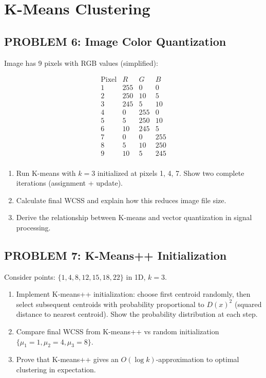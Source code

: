 \documentclass[12pt]{article}
\begin{document}
\newpage
\section*{K-Means Clustering}

\subsection*{PROBLEM 6: Image Color Quantization}

Image has 9 pixels with RGB values (simplified):

\[\begin{array}{c|ccc}
\text{Pixel} & R & G & B \\
\hline
1 & 255 & 0 & 0 \\
2 & 250 & 10 & 5 \\
3 & 245 & 5 & 10 \\
4 & 0 & 255 & 0 \\
5 & 5 & 250 & 10 \\
6 & 10 & 245 & 5 \\
7 & 0 & 0 & 255 \\
8 & 5 & 10 & 250 \\
9 & 10 & 5 & 245 \\
\end{array}\]

\begin{enumerate}
\item[(a)] Run K-means with \(k=3\) initialized at pixels 1, 4, 7. Show two complete iterations (assignment + update).
\item[(b)] Calculate final WCSS and explain how this reduces image file size.
\item[(c)] Derive the relationship between K-means and vector quantization in signal processing.
\end{enumerate}

\subsection*{PROBLEM 7: K-Means++ Initialization}

Consider points: \(\{1, 4, 8, 12, 15, 18, 22\}\) in 1D, \(k=3\).

\begin{enumerate}
\item[(a)] Implement K-means++ initialization: choose first centroid randomly, then select subsequent centroids with probability proportional to \(D(x)^2\) (squared distance to nearest centroid). Show the probability distribution at each step.
\item[(b)] Compare final WCSS from K-means++ vs random initialization \(\{\mu_1=1, \mu_2=4, \mu_3=8\}\).
\item[(c)] Prove that K-means++ gives an \(O(\log k)\)-approximation to optimal clustering in expectation.
\end{enumerate}
\end{document}
